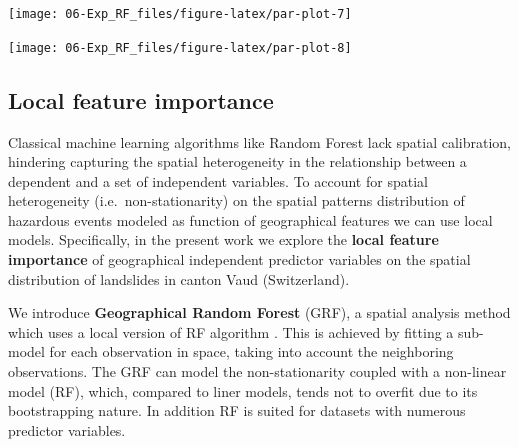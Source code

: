 \documentclass[
]{article}
\newenvironment{Shaded}{\begin{snugshade}}{\end{snugshade}}
\newcommand{\AttributeTok}[1]{\textcolor[rgb]{0.13,0.29,0.53}{#1}}
\newcommand{\CommentTok}[1]{\textcolor[rgb]{0.56,0.35,0.01}{\textit{#1}}}
\newcommand{\ConstantTok}[1]{\textcolor[rgb]{0.56,0.35,0.01}{#1}}
\newcommand{\DecValTok}[1]{\textcolor[rgb]{0.00,0.00,0.81}{#1}}
\newcommand{\FunctionTok}[1]{\textcolor[rgb]{0.13,0.29,0.53}{\textbf{#1}}}
\newcommand{\NormalTok}[1]{#1}
\newcommand{\SpecialCharTok}[1]{\textcolor[rgb]{0.81,0.36,0.00}{\textbf{#1}}}
\newcommand{\StringTok}[1]{\textcolor[rgb]{0.31,0.60,0.02}{#1}}
\begin{document}
\begin{center}\texttt{[image: 06-Exp\_RF\_files/figure-latex/par-plot-7]} \end{center}

\begin{Shaded}
\end{Shaded}

\begin{center}\texttt{[image: 06-Exp\_RF\_files/figure-latex/par-plot-8]} \end{center}

\subsection{Local feature importance}\label{local-feature-importance}

Classical machine learning algorithms like Random Forest lack spatial calibration, hindering capturing the spatial heterogeneity in the relationship between a dependent and a set of independent variables.
To account for spatial heterogeneity (i.e.~non-stationarity) on the spatial patterns distribution of hazardous events modeled as function of geographical features we can use local models.
Specifically, in the present work we explore the \textbf{local feature importance} of geographical independent predictor variables on the spatial distribution of landslides in canton Vaud (Switzerland).

We introduce \textbf{Geographical Random Forest} (GRF), a spatial analysis method which uses a local version of RF algorithm \citep{georganos_forest_2022} .
This is achieved by fitting a sub-model for each observation in space, taking into account the neighboring observations.
The GRF can model the non-stationarity coupled with a non-linear model (RF), which, compared to liner models, tends not to overfit due to its bootstrapping nature.
In addition RF is suited for datasets with numerous predictor variables.
\end{document}
